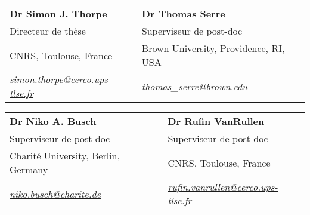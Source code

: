 \documentclass[margin,line]{resume}
\begin{document}
\begin{resume}
	\begin{tabular}{@{}p{6cm}p{6cm}}
	\textbf{Dr Simon J. Thorpe}       &  \textbf{Dr Thomas Serre}                   \\
	Directeur de thèse                              &  Superviseur de post-doc                       \\
	CNRS, Toulouse, France          &  Brown University, Providence, RI, USA        \\
	\textsl{\href{mailto:simon.thorpe@cerco.ups-tlse.fr}{simon.thorpe@cerco.ups-tlse.fr}}   &  
	\textsl{\href{mailto:thomas_serre@brown.edu}{thomas\_serre@brown.edu}}    \\
	\end{tabular}
	
	\begin{tabular}{@{}p{6cm}p{6cm}}
	\textbf{Dr Niko A. Busch}       &  \textbf{Dr Rufin VanRullen}                   \\
	Superviseur de post-doc                   &  Superviseur de post-doc                       \\
	Charité University, Berlin, Germany         &  CNRS, Toulouse, France        \\
	\textsl{\href{mailto:niko.busch@charite.de}{niko.busch@charite.de}}  &  
	\textsl{\href{mailto:rufin.vanrullen@cerco.ups-tlse.fr}{rufin.vanrullen@cerco.ups-tlse.fr}}    \\
	\end{tabular}


	
\end{resume}
\end{document}
